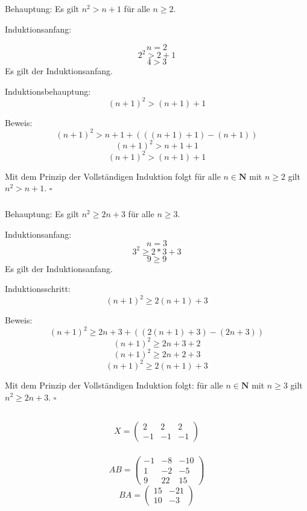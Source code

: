 \documentclass{article}
\begin{document}
\subsection{}
\subsubsection{}
Behauptung: Es gilt $n^2>n+1$ für alle $n\geq 2$.

Induktionsanfang:

$$n=2$$
$$2^2>2+1$$
$$4>3$$
Es gilt der Induktionsanfang.

Induktionsbehauptung:
$$(n+1)^2>(n+1)+1$$

Beweis:
$$(n+1)^2>n+1+(((n+1)+1)-(n+1))$$
$$(n+1)^2>n+1+1$$
$$(n+1)^2>(n+1)+1$$

Mit dem Prinzip der Vollständigen Induktion folgt für alle $n\in \mathbf{N}$ mit $n \geq 2$ gilt $n^2>n+1$.
$\square$

\subsubsection{}
Behauptung: Es gilt $n^2\geq2n+3$ für alle $n\geq 3$.

Induktionsanfang:
$$n=3$$
$$3^2\geq 2*3+3$$
$$9\geq 9$$
Es gilt der Induktionsanfang.

Induktionsschritt:
$$(n+1)^2\geq 2(n+1)+3$$

Beweis:
$$(n+1)^2\geq 2n+3+((2(n+1)+3)-(2n+3))$$
$$(n+1)^2\geq 2n+3+2$$
$$(n+1)^2\geq 2n+2+3$$
$$(n+1)^2\geq 2(n+1)+3$$

Mit dem Prinzip der Vollständigen Induktion folgt: für alle $n\in \mathbf{N}$ mit $n \geq 3$ gilt $n^2\geq2n+3$.
$\square$

\subsection{}
\subsubsection{}

$$
X = \begin{pmatrix}
    2 & 2 & 2 \\
    -1 & -1 & -1 
\end{pmatrix}
$$

\subsubsection{}
$$
AB = \begin{pmatrix}
    -1 & -8 & -10 \\
    1 & -2 & -5 \\ 
    9 & 22 & 15 
\end{pmatrix}
$$
$$
BA = \begin{pmatrix}
    15 & -21 \\
    10 & -3 
\end{pmatrix}
$$
\end{document}
